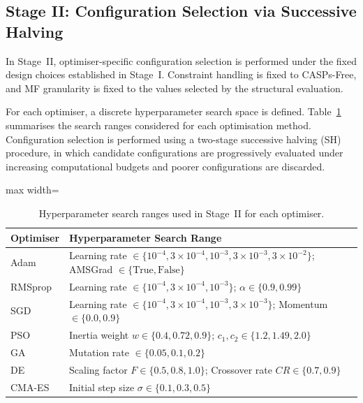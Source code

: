 \documentclass[a4paper,12pt,oneside]{article}
\begin{document}
\subsection{Stage II: Configuration Selection via Successive Halving}

In Stage~II, optimiser-specific configuration selection is performed under the
fixed design choices established in Stage~I.
Constraint handling is fixed to CASPs-Free, and MF granularity is fixed to the
values selected by the structural evaluation.

For each optimiser, a discrete hyperparameter search space is defined.
Table~\ref{tab:sh_ranges} summarises the search ranges considered for each
optimisation method.
Configuration selection is performed using a two-stage successive halving (SH)
procedure, in which candidate configurations are progressively evaluated under
increasing computational budgets and poorer configurations are discarded.

\begin{table}[t]
\centering
\caption{Hyperparameter search ranges used in Stage~II for each optimiser.}
\label{tab:sh_ranges}
\begin{adjustbox}{max width=\linewidth}
\begin{tabular}{ll}
\toprule
\textbf{Optimiser} & \textbf{Hyperparameter Search Range} \\
\midrule
Adam &
Learning rate $\in \{10^{-4}, 3\times10^{-4}, 10^{-3}, 3\times10^{-3}, 3\times10^{-2}\}$;
AMSGrad $\in \{\text{True}, \text{False}\}$ \\

RMSprop &
Learning rate $\in \{10^{-4}, 3\times10^{-4}, 10^{-3}\}$;
$\alpha \in \{0.9, 0.99\}$ \\

SGD &
Learning rate $\in \{10^{-4}, 3\times10^{-4}, 10^{-3}, 3\times10^{-3}\}$;
Momentum $\in \{0.0, 0.9\}$ \\

PSO &
Inertia weight $w \in \{0.4, 0.72, 0.9\}$;
$c_1, c_2 \in \{1.2, 1.49, 2.0\}$ \\

GA &
Mutation rate $\in \{0.05, 0.1, 0.2\}$ \\

DE &
Scaling factor $F \in \{0.5, 0.8, 1.0\}$;
Crossover rate $CR \in \{0.7, 0.9\}$ \\

CMA-ES &
Initial step size $\sigma \in \{0.1, 0.3, 0.5\}$ \\
\bottomrule
\end{tabular}
\end{adjustbox}
\end{table}
\end{document}
